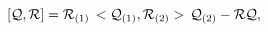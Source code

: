 \begin{equation}\label{9}
 \left[{\cal Q}, {\cal R}\right] = {\cal R}_{(1)}\, <{\cal Q}_{(1)},{\cal R}_{(2)}>\, {\cal Q}_{(2)}
-{\cal R}{\cal Q},
\end{equation}

